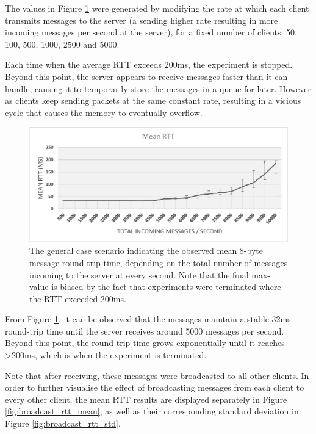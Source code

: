 \documentclass[bsc, 12pt, twoside, singlespacing, parskip, abbrevs, notimes, normalheadings, logo]{styles/infthesis}
\begin{document}
The values in Figure \ref{fig:mean_rtt} were generated by modifying the rate at which each client transmits messages to the server (a sending higher rate resulting in more incoming messages per second at the server), for a fixed number of clients: 50, 100, 500, 1000, 2500 and 5000.

Each time when the average RTT exceeds 200ms, the experiment is stopped. Beyond this point, the server appears to receive messages faster than it can handle, causing it to temporarily store the messages in a queue for later. However as clients keep sending packets at the same constant rate, resulting in a vicious cycle that causes the memory to eventually overflow.

\begin{figure}[H]
\centering
\includegraphics[scale=0.86]{images/mean_rtt.eps}
\caption{The general case scenario indicating the observed mean 8-byte message round-trip time, depending on the total number of messages incoming to the server at every second. Note that the final max-value is biased by the fact that experiments were terminated where the RTT exceeded 200ms.}
\label{fig:mean_rtt}
\end{figure}

From Figure \ref{fig:mean_rtt}, it can be observed that the messages maintain a stable 32ms round-trip time until the server receives around 5000 messages per second. Beyond this point, the round-trip time grows exponentially until it reaches >200ms, which is when the experiment is terminated.

Note that after receiving, these messages were broadcasted to all other clients. In order to further visualise the effect of broadcasting messages from each client to every other client, the mean RTT results are displayed separately in Figure \ref{fig:broadcast_rtt_mean}, as well as their corresponding standard deviation in Figure \ref{fig:broadcast_rtt_std}.
\end{document}
